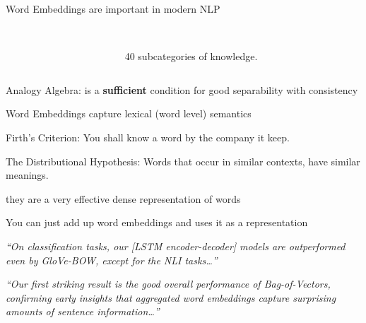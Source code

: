 \documentclass[dvipsnames]{beamer}
\renewcommand{\emph}{\alert}
\newcommand{\countertitle}[1]{\vfill\vfill{\centering \Large \color{bluewrite} #1}\vspace{-0.5cm}}
\newcommand{\mquote}[1]{\textit{``#1''}}
\begin{document}
\begin{frame}{Word Embeddings are important in modern NLP}
\begin{columns}
	\begin{column}{0.5\textwidth}
	\end{column}
	\begin{column}{0.5\textwidth}
		\\
		\vspace{0.5cm}
		\emph{40 subcategories} of knowledge.
	\end{column}
\end{columns}

\countertitle{Analogy Algebra: is a \textbf{sufficient} condition for good separability with consistency}
\end{frame}

\begin{frame}{Word Embeddings capture lexical (word level) semantics}
	\begin{block}{Firth's Criterion: }
		You shall know a word by the company it keep.
	\end{block}
	\vspace{1cm}
	\begin{block}{The Distributional Hypothesis:}
		Words that occur in similar \emph{contexts}, have similar \emph{meanings}.
	\end{block}
\countertitle{they are a very effective dense representation of words}
\end{frame}




\begin{frame}{You can just add up word embeddings and uses it as a representation}
	\begin{block}{\normalsize {}}
		\mquote{On classification tasks,  our [LSTM encoder-decoder] models
			are outperformed even by GloVe-BOW, except
			for the NLI tasks\ldots}
	\end{block}
	
	\begin{block}{\normalsize {}}
		\mquote{Our first striking result is the good overall performance
			of Bag-of-Vectors, confirming early insights
			that aggregated word embeddings capture
			surprising amounts of sentence information\ldots}
	\end{block}
\end{frame}
\end{document}
